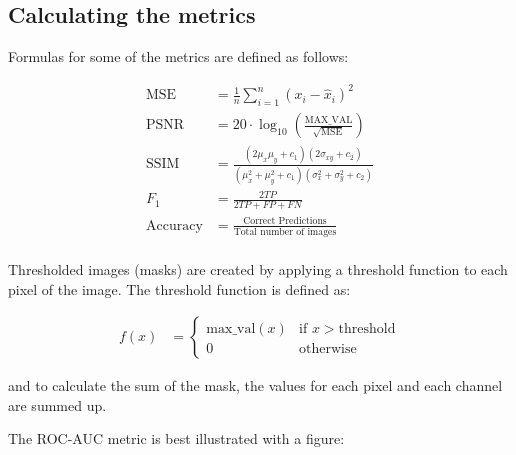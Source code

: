 \subsection{Calculating the metrics}

Formulas for some of the metrics are defined as follows:

\begin{align*}
    \text{MSE} &= \frac{1}{n} \sum_{i=1}^{n} (x_i - \hat{x}_i)^2 \\
    \text{PSNR} &= 20 \cdot \log_{10} \left( \frac{\text{MAX\_VAL}}{\sqrt{\text{MSE}}} \right) \\
    \text{SSIM} &= \frac{(2\mu_x\mu_y + c_1)(2\sigma_{xy} + c_2)}{(\mu_x^2 + \mu_y^2 + c_1)(\sigma_x^2 + \sigma_y^2 + c_2)} \\
    F_1 &= \frac{2TP}{2TP + FP + FN} \\
    \text{Accuracy} &= \frac{\text{Correct Predictions}}{\text{Total number of images}} \\
\end{align*}

Thresholded images (masks) are created by applying a threshold function to each pixel of the image. The threshold function is defined as:

\begin{align*}
    f(x) &= 
    \begin{cases}
        \text{max\_val}(x) & \text{if } x > \text{threshold} \\
        0 & \text{otherwise}
    \end{cases} 
\end{align*}

and to calculate the sum of the mask, the values for each pixel and each channel are summed up.
\par
The ROC-AUC metric is best illustrated with a figure:
